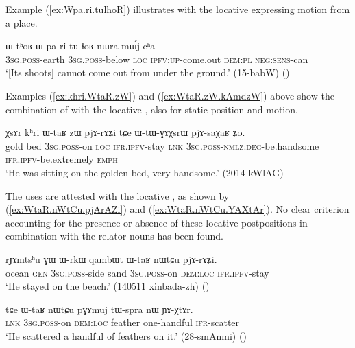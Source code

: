 Example (\ref{ex:Wpa.ri.tulhoR}) illustrates  with the locative  expressing motion from a place.

\begin{exe}
\ex \label{ex:Wpa.ri.tulhoR}
\gll ɯ-tʰoʁ ɯ-pa ri tu-ɬoʁ nɯra mɯ́j-cʰa \\
\textsc{3sg}.\textsc{poss}-earth \textsc{3sg}.\textsc{poss}-below \textsc{loc} \textsc{ipfv}:\textsc{up}-come.out \textsc{dem}:\textsc{pl} \textsc{neg}:\textsc{sens}-can \\
\glt `[Its shoots] cannot come out from under the ground.'  (15-babW)
()
\end{exe}

Examples (\ref{ex:khri.WtaR.zW}) and (\ref{ex:WtaR.zW.kAmdzW}) above show the combination of  with the locative , also for static position and motion.

\begin{exe}
\ex \label{ex:khri.WtaR.zW}
\gll χsɤr kʰri ɯ-taʁ zɯ pjɤ-rɤʑi tɕe ɯ-tɯ-ɣɤχsrɯ pjɤ-saχaʁ ʑo. \\
gold bed \textsc{3sg}.\textsc{poss}-on \textsc{loc} \textsc{ifr}.\textsc{ipfv}-stay \textsc{lnk} \textsc{3sg}.\textsc{poss}-\textsc{nmlz}:\textsc{deg}-be.handsome \textsc{ifr}.\textsc{ipfv}-be.extremely \textsc{emph} \\
\glt `He was sitting on the golden bed, very handsome.' (2014-kWlAG)
\end{exe}

The uses are attested with the locative , as shown by (\ref{ex:WtaR.nWtCu.pjArAZi}) and (\ref{ex:WtaR.nWtCu.YAXtAr}). No clear criterion accounting for the presence or absence of these locative postpositions in combination with the relator nouns has been found.

\begin{exe}
\ex \label{ex:WtaR.nWtCu.pjArAZi}
\gll  rɟɤmtsʰu ɣɯ ɯ-rkɯ qambɯt ɯ-taʁ nɯtɕu pjɤ-rɤʑi. \\
ocean \textsc{gen} \textsc{3sg}.\textsc{poss}-side sand \textsc{3sg}.\textsc{poss}-on \textsc{dem}:\textsc{loc} \textsc{ifr}.\textsc{ipfv}-stay \\
\glt `He stayed on the beach.' (140511 xinbada-zh)
()
\end{exe}

\begin{exe}
\ex \label{ex:WtaR.nWtCu.YAXtAr}
\gll tɕe ɯ-taʁ nɯtɕu pɣɤmuj tɯ-spra nɯ ɲɤ-χtɤr. \\
\textsc{lnk} \textsc{3sg}.\textsc{poss}-on \textsc{dem}:\textsc{loc} feather one-handful \textsc{ifr}-scatter \\
\glt `He scattered a handful of feathers on it.' (28-smAnmi)
()
\end{exe}

